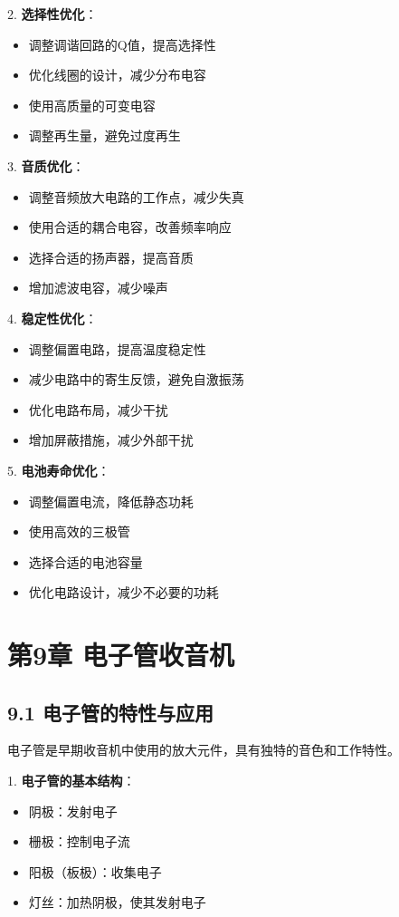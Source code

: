 \documentclass[12pt,UTF8]{ctexbook}
\begin{document}
2. \textbf{选择性优化}：
   \begin{itemize}[leftmargin=3.5em]
   \item 调整调谐回路的Q值，提高选择性
   \item 优化线圈的设计，减少分布电容
   \item 使用高质量的可变电容
   \item 调整再生量，避免过度再生
   \end{itemize}

3. \textbf{音质优化}：
   \begin{itemize}[leftmargin=3.5em]
   \item 调整音频放大电路的工作点，减少失真
   \item 使用合适的耦合电容，改善频率响应
   \item 选择合适的扬声器，提高音质
   \item 增加滤波电容，减少噪声
   \end{itemize}

4. \textbf{稳定性优化}：
   \begin{itemize}[leftmargin=3.5em]
   \item 调整偏置电路，提高温度稳定性
   \item 减少电路中的寄生反馈，避免自激振荡
   \item 优化电路布局，减少干扰
   \item 增加屏蔽措施，减少外部干扰
   \end{itemize}

5. \textbf{电池寿命优化}：
   \begin{itemize}[leftmargin=3.5em]
   \item 调整偏置电流，降低静态功耗
   \item 使用高效的三极管
   \item 选择合适的电池容量
   \item 优化电路设计，减少不必要的功耗
   \end{itemize}

\chapter*{第9章 电子管收音机}
\section*{9.1 电子管的特性与应用}

电子管是早期收音机中使用的放大元件，具有独特的音色和工作特性。

1. \textbf{电子管的基本结构}：
   \begin{itemize}[leftmargin=3.5em]
   \item 阴极：发射电子
   \item 栅极：控制电子流
   \item 阳极（板极）：收集电子
   \item 灯丝：加热阴极，使其发射电子
   \end{itemize}
\end{document}
